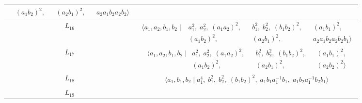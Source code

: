 \documentclass[dvipsnames]{article}
\theoremstyle{definition}
\theoremstyle{remark}
\begin{document}
\begin{longtable}{ |c|c| }
\begin{minipage}{6cm}
{\begin{align*}
            & (a_1 b_2)^2, && (a_2 b_1)^2, && a_2 a_1 b_2 a_2 b_2
            \big \rangle
        \end{align*}
        \vspace{-5mm}
        }
    \end{minipage}\\
    \hline
    $L_{16}$
    &
    \begin{minipage}{6cm}
        {
        \vspace{-2.5mm}
        \begin{align*}
            \big \langle
            a_1, a_2, b_1, b_2 \; \big | \;
            & a_1^2, \; a_2^2, \; (a_1 a_2)^2, && b_1^2, \; b_2^2, \; (b_1 b_2)^2, && (a_1 b_1)^2,\\
            & (a_1 b_2)^2, && (a_2 b_1)^2, && a_2 a_1 b_2 a_2 b_2 b_1 
            \big \rangle
        \end{align*}
        \vspace{-5mm}
        }
    \end{minipage}\\
    \hline
    $L_{17}$
    &
    \begin{minipage}{6cm}
        {
        \vspace{-2.5mm}
        \begin{align*}
            \big \langle
            a_1, a_2, b_1, b_2 \; \big | &
            a_1^2, \; a_2^2, \; (a_1 a_2)^2, &&  b_1^2, \; b_2^2, \; (b_1 b_2)^2, && (a_1 b_1)^2, \\
            & (a_1 b_2)^2, && (a_2 b_1)^2, && (a_2 b_2)^2
            \big \rangle
        \end{align*}
        \vspace{-5mm}
        }
    \end{minipage}\\
    \hline
    $L_{18}$
    &
    \begin{minipage}{6cm}
        {
        \vspace{-2.5mm}
        \begin{align*}
            \big \langle
            a_1, b_1, b_2 \; \big | \;
            a_1^4, \; b_1^2, \; b_2^2, \; (b_1 b_2)^2, \; a_1 b_1 a_1^{-1} b_1, \; a_1 b_2 a_1^{-1} b_2 b_1
            \big \rangle
        \end{align*}
        \vspace{-5mm}
        }
    \end{minipage}\\
    \hline
    $L_{19}$
    &
    \begin{minipage}{6cm}

\end{minipage}
\end{longtable}
\end{document}
